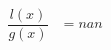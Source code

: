 \documentclass[preview]{standalone}
\begin{document}
\begin{align*}
\dfrac{l(x)}{g(x)} &= nan
\end{align*}
\end{document}
